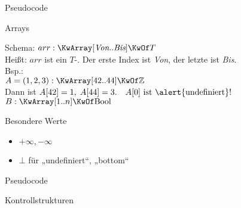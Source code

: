 \begin{frame}{Pseudocode}
	\begin{exampleblock}{Arrays}
		\begin{algorithm}[H]
			Schema: \quad $ arr : \KwArray[\textit{Von}..\textit{Bis}] \KwOf T $ \\
			Heißt: \quad $arr$ ist ein $T$-\KwArray. Der erste Index ist \textit{Von}, der letzte ist \textit{Bis}. \\ 
			\forcenewline
			\pause
			Bsp.: \\ 
			\quad $A = (1,2,3): \KwArray[42..44] \KwOf \Z$ \\
			\quad \impl Dann ist $A[42] = 1, \; A[44] = 3. \quad A[0] \text{ ist \alert{undefiniert}!}$ \\ 
			\pause
			\quad $B: \KwArray[1..n] \KwOf \|Bool|$ \qquad {}
		\end{algorithm}
	\end{exampleblock}
	\pause
	\begin{exampleblock}{Besondere Werte}
		\begin{itemize}
			\item $+\infty, -\infty$
			\item $\bot$ für „undefiniert“, „bottom“
		\end{itemize}
	\end{exampleblock}
\end{frame}

\begin{frame} {Pseudocode}
	\begin{exampleblock}{Kontrollstrukturen}
		\begin{columns}
			\begin{column}{0.45\textwidth}
				\begin{algorithm}[H]
					 {
						 \;
					}  \; %
					 {
						 \;
					} {
						 \;
					} \; %
					 {
						 \;
					}
				\end{algorithm}
			\end{column}
			\begin{column}{0.45\textwidth}
				\begin{algorithm}[H]
					 \;
					\;
					\;   %
					\;
					\vspace{-4pt}
					\;
					\;
					 {
						 \;
					}
			\end{algorithm}
			\end{column}
		\end{columns}
		
\end{exampleblock}
\end{frame}


